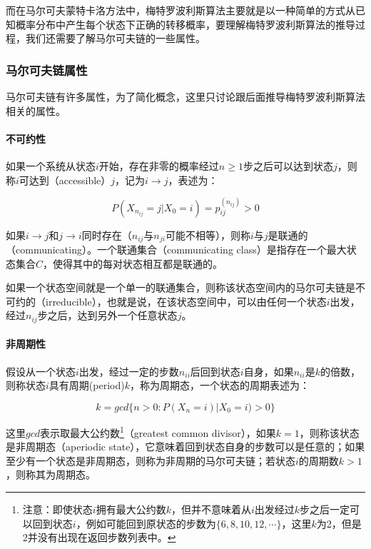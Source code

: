 而在马尔可夫蒙特卡洛方法中，梅特罗波利斯算法主要就是以一种简单的方式从已知概率分布中产生每个状态下正确的转移概率，要理解梅特罗波利斯算法的推导过程，我们还需要了解马尔可夫链的一些属性。




\subsubsection{马尔可夫链属性}
马尔可夫链有许多属性，为了简化概念，这里只讨论跟后面推导梅特罗波利斯算法相关的属性。


\paragraph{不可约性}
如果一个系统从状态$i$开始，存在非零的概率经过$n\geq 1$步之后可以达到状态$j$，则称$i$可达到（accessible）$j$，记为$i\rightarrow j$，表述为：

\begin{equation}
	P(X_{n_{ij}}=j|X_0=i)=p^{(n_{ij})}_{ij}>0
\end{equation}

\noindent 如果$i\rightarrow j$和$j\rightarrow i$同时存在（$n_{ij}$与$n_{ji}$可能不相等），则称$i$与$j$是联通的（communicating）。一个联通集合（communicating class）是指存在一个最大状态集合$C$，使得其中的每对状态相互都是联通的。

如果一个状态空间就是一个单一的联通集合，则称该状态空间内的马尔可夫链是不可约的（irreducible），也就是说，在该状态空间中，可以由任何一个状态$i$出发，经过$n_{ij}$步之后，达到另外一个任意状态$j$。




\paragraph{非周期性}
假设从一个状态$i$出发，经过一定的步数$n_{ii}$后回到状态$i$自身，如果$n_{ii}$是$k$的倍数，则称状态$i$具有周期(period)$k$，称为周期态，一个状态的周期表述为：

\begin{equation}
	k=gcd\{n>0:P(X_n=i)|X_0=i)>0\}
\end{equation}

\noindent 这里$gcd$表示取最大公约数\footnote{注意：即使状态$i$拥有最大公约数$k$，但并不意味着从$i$出发经过$k$步之后一定可以回到状态$i$，例如可能回到原状态的步数为$\{6,8,10,12,\cdots\}$，这里$k$为2，但是2并没有出现在返回步数列表中。}（greatest common divisor），如果$k=1$，则称该状态是非周期态（aperiodic state），它意味着回到状态自身的步数可以是任意的；如果至少有一个状态是非周期态，则称为非周期的马尔可夫链；若状态$i$的周期数$k>1$，则称其为周期态。



